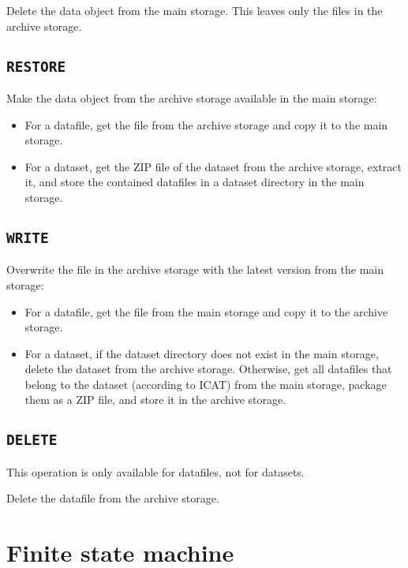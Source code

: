 \documentclass[paper=a4]{scrartcl}
\begin{document}
Delete the data object from the main storage.  This leaves only the
files in the archive storage.

\subsection{\texttt{RESTORE}}
\label{sec:defops:restore}

Make the data object from the archive storage available in the
main storage:
\begin{itemize}[noitemsep,topsep=0pt]
\item For a datafile, get the file from the archive storage and
copy it to the main storage.
\item For a dataset, get the ZIP file of the dataset from the
archive storage, extract it, and store the contained datafiles in a
dataset directory in the main storage.
\end{itemize}

\subsection{\texttt{WRITE}}
\label{sec:defops:write}

Overwrite the file in the archive storage with the latest version
from the main storage:
\begin{itemize}[noitemsep,topsep=0pt]
\item For a datafile, get the file from the main storage and copy it
to the archive storage.
\item For a dataset, if the dataset directory does not exist in the
main storage, delete the dataset from the archive storage. Otherwise,
get all datafiles that belong to the dataset (according to ICAT) from
the main storage, package them as a ZIP file, and store it in the
archive storage.
\end{itemize}

\subsection{\texttt{DELETE}}
\label{sec:defops:delete}

This operation is only available for datafiles, not for datasets.

Delete the datafile from the archive storage.


\section{Finite state machine}
\label{sec:fsm}
\end{document}
